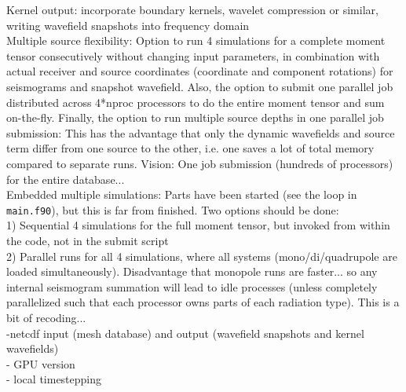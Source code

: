 \documentclass[11pt,letter,fleqn,english,notitlepage]{article}
\begin{document}
\noindent Kernel output: incorporate boundary kernels, wavelet compression or similar, writing wavefield snapshots into
frequency domain\\

\noindent Multiple source flexibility: Option to run 4 simulations for a complete moment tensor 
consecutively without changing input parameters, in combination with 
actual receiver and source coordinates (coordinate and component rotations) for seismograms and snapshot wavefield. 
Also, the option to submit one parallel job distributed across 4*nproc processors to do the entire moment tensor and 
sum on-the-fly. Finally, the option to run multiple source depths in one parallel job submission: This has the advantage 
that only the dynamic wavefields and source term differ from one source to the other, i.e. one saves a lot of total memory 
compared to separate runs. Vision: One job submission (hundreds of processors) for the entire database...\\

\noindent Embedded multiple simulations: Parts have been started (see the loop in {\tt main.f90}), but this is far from finished. 
  Two options should be done: \\
        1) Sequential 4 simulations for the full moment tensor, but invoked from within the code, not in the submit script\\
        2) Parallel runs for all 4 simulations, where all systems (mono/di/quadrupole are loaded simultaneously). Disadvantage that 
            monopole runs are faster... so any internal seismogram summation will lead to idle processes (unless completely parallelized such that each processor owns parts of each radiation type). This is a bit of recoding...\\

-netcdf input (mesh database) and output (wavefield snapshots and kernel wavefields)\\

- GPU version\\

- local timestepping


\newpage
\end{document}
